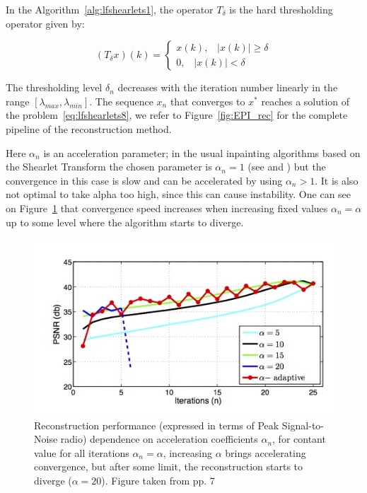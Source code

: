 \bigskip

In the Algorithm~\ref{alg:lfshearlets1}, the operator $T_{\delta}$ is the hard thresholding operator given by:

$$
(T_{\delta}x)(k)=\begin{cases} x(k)\textrm{,}\quad |x(k)|\geq \delta \\ 0\textrm{,}\quad |x(k)|<\delta \end{cases}
$$

The thresholding level $\delta_n$ decreases with the iteration number linearly in the range $[\lambda_{max},\lambda_{min}]$. The sequence $x_n$ that converges to $x^*$ reaches a solution of the problem~\ref{eq:lfshearlets8}, we refer to Figure~\ref{fig:EPI_rec} for the complete pipeline of the reconstruction method.

\bigskip

Here $\alpha_n$ is an acceleration parameter; in the usual inpainting algorithms based on the Shearlet Transform the chosen parameter is $\alpha_n=1$ (see \cite{Analysisinpaint} and \cite{Shearlab}) but the convergence in this case is slow and can be accelerated by using $\alpha_n>1$. It is also not optimal to take alpha too high, since this can cause instability. One can see on Figure~\ref{fig:alpha_accel} that convergence speed increases when increasing fixed values $\alpha_n = \alpha$ up to some level where the algorithm starts to diverge.

\begin{figure}[h!]
\centering
\includegraphics[width = 0.9 \textwidth]{./Diagrams/alpha_accel.jpg}
\caption{Reconstruction performance (expressed in terms of Peak Signal-to-Noise radio) dependence on acceleration coefficients $\alpha_n$, for contant value for all iterations $\alpha_n=\alpha$, increasing $\alpha$ brings accelerating convergence, but after some limit, the reconstruction starts to diverge ($\alpha = 20$). Figure taken from \cite{LF-Shearlets} pp. 7}
\label{fig:alpha_accel}
\end{figure}

